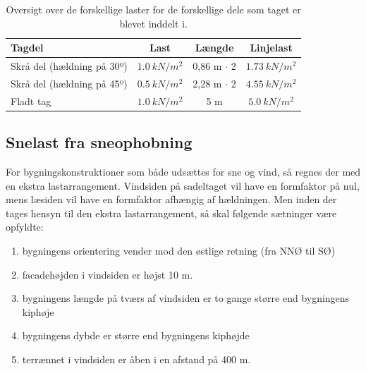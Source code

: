 \begin{table}[H]
\centering
\begin{tabular}{|l|c|c|c|}
\hline
\textbf{Tagdel}            & \textbf{Last} & \textbf{Længde} & \textbf{Linjelast} \\ \hline
Skrå del (hældning på 30º) & $\SI{1,0}{kN/m^2}$                      & 0,86 m $\cdot$ 2              & $\SI{1,73}{kN/m^2}$                                                                                                               \\ \hline
Skrå del (hældning på 45º) & $\SI{0,5}{kN/m^2}$                                     & 2,28 m $\cdot$ 2               & $\SI{4,55}{kN/m^2}$                                                                                                              \\ \hline
Fladt tag                  & $\SI{1,0}{kN/m^2}$                     &  5 m               & $\SI{5,0}{kN/m^2}$                                                                                                               \\ \hline
\end{tabular}
\caption{Oversigt over de forskellige laster for de forskellige dele som taget er blevet inddelt i.}
\label{tab:SLT2}
\end{table}


\subsection{Snelast fra sneophobning}
For bygningskonstruktioner som både udsættes for sne og vind, så regnes der med en ekstra lastarrangement. Vindsiden på sadeltaget vil have en formfaktor på nul, mens læsiden vil have en formfaktor afhængig af hældningen. Men inden der tages hensyn til den ekstra lastarrangement, så skal følgende sætninger være opfyldte:





\begin{enumerate}
\item bygningens orientering vender mod den østlige retning (fra NNØ til SØ)
\item facadehøjden i vindsiden er højst 10 m.
\item bygningens længde på tværs af vindsiden er to gange større end bygningens kiphøje
\item bygningens dybde er større end bygningens kiphøjde
\item terrænnet i vindsiden er åben i en afstand på 400 m.
\end{enumerate}

